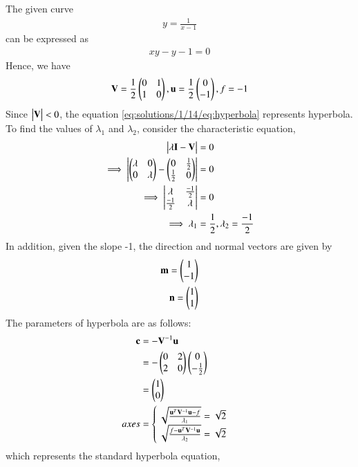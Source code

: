 The given curve 
\begin{align}
	y =\frac{1}{x-1}
\end{align}
can be expressed as 
\begin{align}
	xy - y - 1 = 0 \label{eq:solutions/1/14/eq:hyperbola}
\end{align}
Hence, we have
\begin{align}
	\mathbf{V} = \frac{1}{2}\begin{pmatrix}0 & 1 \\ 1 & 0\end{pmatrix}, 
	\mathbf{u} = \frac{1}{2}\begin{pmatrix}0 \\-1\end{pmatrix},
	f = -1
\end{align}
Since $\begin{vmatrix}\mathbf{V}\end{vmatrix} < 0$, the equation \eqref{eq:solutions/1/14/eq:hyperbola} represents hyperbola.
To find the values of $\lambda_1$ and $\lambda_2$, consider the characteristic equation,
\begin{align}
	\begin{vmatrix}\lambda\mathbf{I} - \mathbf{V}\end{vmatrix} &= 0\\
	\implies \begin{vmatrix}\begin{pmatrix}\lambda & 0\\0 & \lambda\end{pmatrix} - \begin{pmatrix}0 & \frac{1}{2} \\ \frac{1}{2} & 0\end{pmatrix}\end{vmatrix} &= 0\\
	\implies \begin{vmatrix} \lambda & \frac{-1}{2} \\ \frac{-1}{2} & \lambda\end{vmatrix} &= 0\\
	\implies \lambda_1 &= \frac{1}{2} , \lambda_2 = \frac{-1}{2}
\end{align}
In addition, given the slope -1, the direction and normal vectors are given by 
\begin{align}
	\mathbf{m} = \begin{pmatrix}1 \\ -1\end{pmatrix} \\
	\mathbf{n} = \begin{pmatrix} 1 \\ 1\end{pmatrix}
\end{align}
The parameters of hyperbola are as follows:
\begin{align}
	\mathbf{c} &= -\mathbf{V}^{-1}\mathbf{u} \\
	&= -\begin{pmatrix}0 & 2\\ 2 & 0\end{pmatrix}\begin{pmatrix}0 \\ -\frac{1}{2}\end{pmatrix} \\
	&= \begin{pmatrix}1 \\ 0\end{pmatrix}\\
	axes &= \begin{cases}
	\sqrt{\frac{\mathbf{u}^T\mathbf{V}^{-1}\mathbf{u} - f}{\lambda_1}} = \sqrt{2}\\
 \sqrt{\frac{f-\mathbf{u}^T\mathbf{V}^{-1}\mathbf{u}}{\lambda_2}} = \sqrt{2}
\end{cases}
\end{align}
which represents the standard hyperbola equation,
